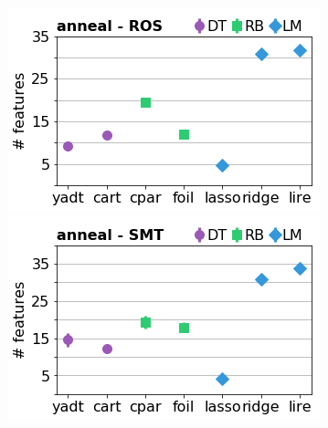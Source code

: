 \documentclass[runningheads,a4paper]{llncs}
\begin{document}
\begin{figure}[!h]
\includegraphics[width=0.32\linewidth]{fig/models_anneal_ROS_nbr_features.png}
\includegraphics[width=0.32\linewidth]{fig/models_anneal_SMT_nbr_features.png}
\end{figure}
\end{document}

